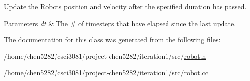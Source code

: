 Update the \hyperlink{classRobot}{Robot}\textquotesingle{}s position and velocity after the specified duration has passed. 


\begin{DoxyParams}{Parameters}
{\em dt} & The \# of timesteps that have elapsed since the last update. \\
\hline
\end{DoxyParams}


The documentation for this class was generated from the following files\+:\begin{DoxyCompactItemize}
\item 
/home/chen5282/csci3081/project-\/chen5282/iteration1/src/\hyperlink{robot_8h}{robot.\+h}\item 
/home/chen5282/csci3081/project-\/chen5282/iteration1/src/\hyperlink{robot_8cc}{robot.\+cc}\end{DoxyCompactItemize}
